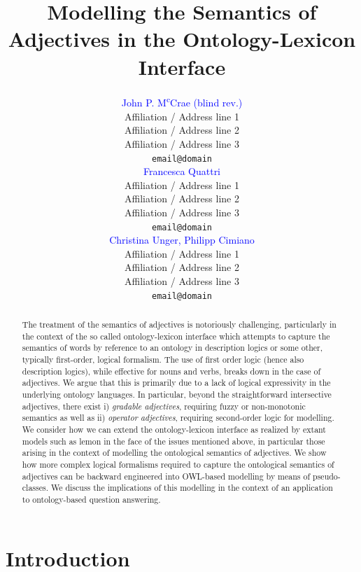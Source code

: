 \documentclass[11pt]{article}
\title{Modelling the Semantics of Adjectives in the Ontology-Lexicon Interface}
\author{\textcolor{blue}{John P. M\textsuperscript{c}Crae (blind rev.)}\\
  Affiliation / Address line 1 \\
  Affiliation / Address line 2 \\
  Affiliation / Address line 3 \\
  {\tt email@domain} \\\And
  \textcolor{blue}{Francesca Quattri} \\
  Affiliation / Address line 1 \\
  Affiliation / Address line 2 \\
  Affiliation / Address line 3 \\
  {\tt email@domain} \\\And
  \textcolor{blue}{Christina Unger, Philipp Cimiano} \\
  Affiliation / Address line 1 \\
  Affiliation / Address line 2 \\
  Affiliation / Address line 3 \\
{\tt email@domain}}
\date{}
\begin{document}
\maketitle
\begin{abstract}
The treatment of the semantics of adjectives is notoriously challenging, particularly in the context of the so called ontology-lexicon interface which attempts to capture the semantics of words by reference to an ontology in description logics or some other, typically first-order, logical formalism.
The use of first order logic (hence also description logics),
while effective for nouns and verbs, breaks down in the case of adjectives. 
We argue that this is primarily due to a lack of logical expressivity in the 
underlying ontology languages. In particular, beyond the straightforward intersective adjectives, there exist i) \emph{gradable adjectives}, requiring fuzzy or
non-monotonic semantics as well as ii) \emph{operator adjectives}, requiring second-order logic for modelling. 
We consider how we can extend the ontology-lexicon interface as realized by extant models such as lemon in the face of the issues mentioned above, in particular those arising in the context of modelling the ontological semantics of adjectives. We show how more complex logical formalisms required to capture the ontological semantics of adjectives can be backward 
engineered into OWL-based modelling by means of pseudo-classes. We discuss the implications of this modelling in the context of an application to ontology-based question answering.
\end{abstract}



\section{Introduction}
\label{intro}
\end{document}
